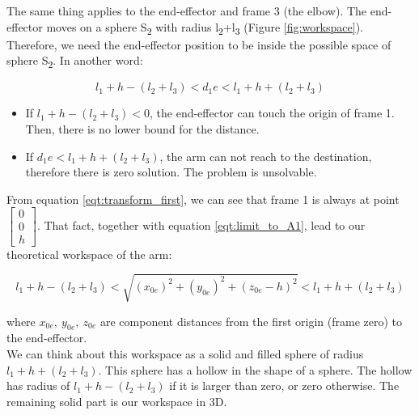 \documentclass[conference]{IEEEtran}
\def\SB#1{\textsubscript{\textcolor{black}{#1}}}
\begin{document}
  The same thing applies to the end-effector and frame 3 (the elbow). The end-effector moves on a sphere S\SB{2} with radius l\SB{2}+l\SB{3} (Figure \ref{fig:workspace}). Therefore, we need the end-effector position to be inside the possible space of sphere S\SB{2}. In another word:
  \begin{center}
  \vspace{-0.5cm}
  	\begin{equation} \label{eqt:limit_to_A1}
  	l_1 + h - (l_2 + l_3) < d_1e < l_1 + h + (l_2 + l_3)
  	\end{equation}
  \end{center}
  \begin{itemize}
  	\item If $l_1 + h - (l_2 + l_3) < 0$, the end-effector can touch the origin of frame 1. Then, there is no lower bound for the distance.
  	\item If $d_1e < l_1 + h + (l_2 + l_3)$, the arm can not reach to the destination, therefore there is zero solution. The problem is unsolvable.
  \end{itemize}
  From equation \ref{eqt:transform_first}, we can see that frame 1 is always at point
  $\begin{bmatrix}
  0\\
  0\\
  h
  \end{bmatrix}$.
  That fact, together with equation \ref{eqt:limit_to_A1}, lead to our theoretical workspace of the arm:
  \begin{center}
  	\begin{equation} \label{eqt:theoretical_workspace}
  	l_1 + h - (l_2 + l_3) < \sqrt{(x_{0e})^2+(y_{0e})^2+(z_{0e} - h)^2} < l_1 + h + (l_2 + l_3)
  	\end{equation}
  \end{center}
  where $x_{0e},\ y_{0e},\ z_{0e}$ are component distances from the first origin (frame zero) to the end-effector.\\
  We can think about this workspace as a solid and filled sphere of radius $l_1 + h + (l_2 + l_3)$. This sphere has a hollow in the shape of a sphere. The hollow has radius of $l_1 + h - (l_2 + l_3)$ if it is larger than zero, or zero otherwise. The remaining solid part is our workspace in 3D.
  
\end{document}
